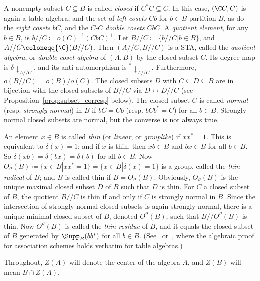 A nonempty subset $C \subseteq B$ is called \emph{closed} if $C^*C
\subseteq C$. In this case, $({\C}C, C)$ is again a table algebra, and
the set of \emph{left cosets} $Cb$ for $b \in B$ partition $B$, as do
the \emph{right cosets} $bC$, and the $C$-$C$ \emph{double cosets}
$CbC$. A \emph{quotient element}, for any $b \in B$, is $b//C \coloneqq 
o(C)^{-1}(CbC)^+$. Let $B//C \coloneqq \{b//C | b \in B\}$, and
$A//C \coloneqq {\C}(B//C)$. Then $(A//C, B//C)$ is a
STA, called the \emph{quotient algebra}, or \emph{double coset algebra}
of $(A, B)$ by the closed subset $C$. Its degree map is
$\delta\downarrow _{A//C}$, and its anti-automorphism is
${^*}\downarrow_{A//C}$. Furthermore, $o(B//C) =
o(B)/o(C)$. The closed subsets $D$ with $C \subseteq D \subseteq B$ are
in bijection with the closed subsets of $B//C$ via $D
\leftrightarrow D//C$ (see Proposition~\ref{prop:subset_corresp} below). The closed subset $C$ is called \emph{normal} (resp.
\emph{strongly normal}) in $B$ if $bC = Cb$ (resp. $bCb^* = C$) for all
$b \in B$. Strongly normal closed subsets are normal, but the converse
is not always true. 

An element $x \in B$ is called \emph{thin} (or \emph{linear}, or
\emph{grouplike}) if $xx^* = 1$. This is equivalent to $\delta(x) = 1$; 
and if $x$ is thin, then $xb \in B$ and $bx \in B$ for all $b \in B$.
So $\delta(xb) = \delta(bx) = \delta(b)$ for all $b \in B$. Now
$O_{\vartheta}(B)\coloneqq \{x \in B | xx^* = 1\} = \{x \in B |
\delta(x) = 1\}$ is a group, called the \emph{thin radical} of $B$; and
$B$ is called thin if $B = O_{\vartheta}(B)$. Obviously,
$O_{\vartheta}(B)$ is the unique maximal closed subset $D$ of $B$
such that $D$ is thin. For $C$ a closed subset of $B$, the quotient
$B//C$ is thin if and only if $C$ is strongly normal in $B$. Since the
intersection of strongly normal closed subsets is again strongly normal,
there is a unique minimal closed subset of $B$, denoted
$O^{\vartheta}(B)$, such that $B//O^{\vartheta}(B)$ is thin. Now
$O^{\vartheta}(B)$ is called the \emph{thin residue} of $B$, and it
equals the closed subset of $B$ generated by $\Supp _B(bb^*)$ for
all $b \in B$. (See~\cite[Theorem~2.3.1]{Z1} or~\cite [Theorem~3.2.1]{Z2}, 
where the algebraic proof for association schemes holds
verbatim for table algebras.) 


Throughout, $Z(A)$ will denote the center of the algebra $A$, and $Z(B)$
will mean $B \cap Z(A)$.

